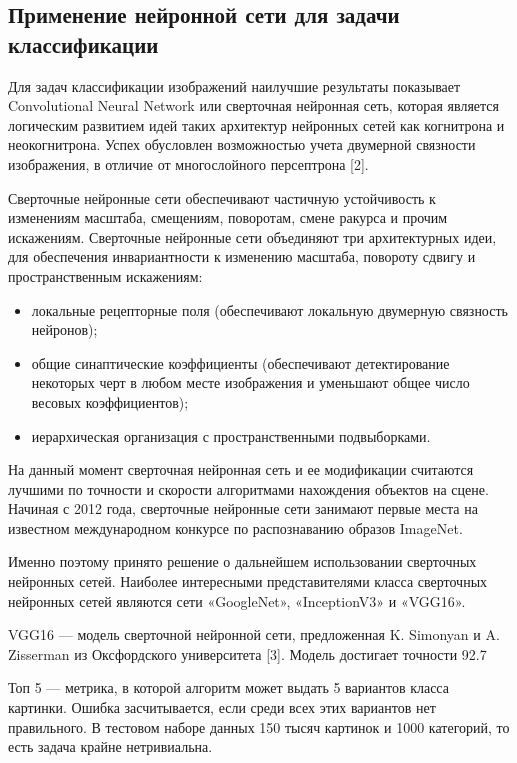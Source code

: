 \subsection{Применение нейронной сети для задачи классификации}

Для задач классификации изображений наилучшие результаты показывает Convolutional Neural Network или сверточная нейронная сеть, которая является логическим развитием идей таких архитектур нейронных сетей как когнитрона и неокогнитрона. 
Успех обусловлен возможностью учета двумерной связности изображения, в отличие от многослойного персептрона [2]. 

Сверточные нейронные сети обеспечивают частичную устойчивость к изменениям масштаба, смещениям, поворотам, смене ракурса и прочим искажениям. 
Сверточные нейронные сети объединяют три архитектурных идеи, для обеспечения инвариантности к изменению масштаба, повороту сдвигу и пространственным искажениям:
\begin{itemize}
    \item локальные рецепторные поля (обеспечивают локальную двумерную связность нейронов);
    \item общие синаптические коэффициенты (обеспечивают детектирование некоторых черт в любом месте изображения и уменьшают общее число весовых коэффициентов);
    \item иерархическая организация с пространственными подвыборками.
\end{itemize}

На данный момент сверточная нейронная сеть и ее модификации считаются лучшими по точности и скорости алгоритмами нахождения объектов на сцене. 
Начиная с 2012 года, сверточные нейронные сети занимают первые места на известном международном конкурсе по распознаванию образов ImageNet.

Именно поэтому принято решение о дальнейшем использовании сверточных нейронных сетей. 
Наиболее интересными представителями класса сверточных нейронных сетей являются сети «GoogleNet», «InceptionV3» и «VGG16».

VGG16 — модель сверточной нейронной сети, предложенная K. Simonyan и A. Zisserman из Оксфордского университета [3]. 
Модель достигает точности 92.7%

Топ 5 — метрика, в которой алгоритм может выдать 5 вариантов класса картинки. Ошибка засчитывается, если среди всех этих вариантов нет правильного. В тестовом наборе данных 150 тысяч картинок и 1000 категорий, то есть задача крайне нетривиальна.

